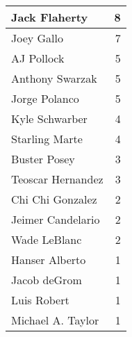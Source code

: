 \begin{table}
\begin{tabular}[t]{l|r}
\hline
Jack Flaherty & 8\\
\hline
Joey Gallo & 7\\
\hline
AJ Pollock & 5\\
\hline
Anthony Swarzak & 5\\
\hline
Jorge Polanco & 5\\
\hline
Kyle Schwarber & 4\\
\hline
Starling Marte & 4\\
\hline
Buster Posey & 3\\
\hline
Teoscar Hernandez & 3\\
\hline
Chi Chi Gonzalez & 2\\
\hline
Jeimer Candelario & 2\\
\hline
Wade LeBlanc & 2\\
\hline
Hanser Alberto & 1\\
\hline
Jacob deGrom & 1\\
\hline
Luis Robert & 1\\
\hline
Michael A. Taylor & 1\\
\hline
\end{tabular}
\end{table}
